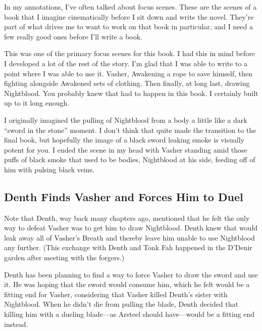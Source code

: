 In my annotations, I’ve often talked about focus scenes. These are the scenes of a book that I imagine cinematically before I sit down and write the novel. They’re part of what drives me to want to work on that book in particular, and I need a few really good ones before I’ll write a book.

This was one of the primary focus scenes for this book. I had this in mind before I developed a lot of the rest of the story. I’m glad that I was able to write to a point where I was able to use it. Vasher, Awakening a rope to save himself, then fighting alongside Awakened sets of clothing. Then finally, at long last, drawing Nightblood. You probably knew that had to happen in this book. I certainly built up to it long enough.

I originally imagined the pulling of Nightblood from a body a little like a dark “sword in the stone” moment. I don’t think that quite made the transition to the final book, but hopefully the image of a black sword leaking smoke is visually potent for you. I ended the scene in my head with Vasher standing amid those puffs of black smoke that used to be bodies, Nightblood at his side, feeding off of him with pulsing black veins.

\subsection*{Denth Finds Vasher and Forces Him to Duel}

Note that Denth, way back many chapters ago, mentioned that he felt the only way to defeat Vasher was to get him to draw Nightblood. Denth knew that would leak away all of Vasher’s Breath and thereby leave him unable to use Nightblood any further. (This exchange with Denth and Tonk Fah happened in the D’Denir garden after meeting with the forgers.)

Denth has been planning to find a way to force Vasher to draw the sword and use it. He was hoping that the sword would consume him, which he felt would be a fitting end for Vasher, considering that Vasher killed Denth’s sister with Nightblood. When he didn’t die from pulling the blade, Denth decided that killing him with a dueling blade—as Arsteel should have—would be a fitting end instead.



